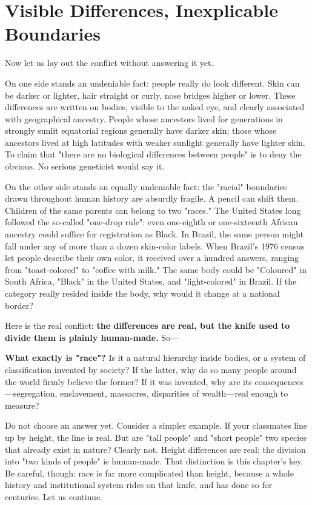 \section{Visible Differences, Inexplicable Boundaries}
Now let us lay out the conflict without answering it yet.

On one side stands an undeniable fact: people really do look different. Skin can be darker or lighter, hair straight or curly, nose bridges higher or lower. These differences are written on bodies, visible to the naked eye, and clearly associated with geographical ancestry. People whose ancestors lived for generations in strongly sunlit equatorial regions generally have darker skin; those whose ancestors lived at high latitudes with weaker sunlight generally have lighter skin. To claim that "there are no biological differences between people" is to deny the obvious. No serious geneticist would say it.

On the other side stands an equally undeniable fact: the "racial" boundaries drawn throughout human history are absurdly fragile. A pencil can shift them. Children of the same parents can belong to two "races." The United States long followed the so-called "one-drop rule": even one-eighth or one-sixteenth African ancestry could suffice for registration as Black. In Brazil, the same person might fall under any of more than a dozen skin-color labels. When Brazil's 1976 census let people describe their own color, it received over a hundred answers, ranging from "toast-colored" to "coffee with milk." The same body could be "Coloured" in South Africa, "Black" in the United States, and "light-colored" in Brazil. If the category really resided inside the body, why would it change at a national border?

Here is the real conflict: \textbf{the differences are real, but the knife used to divide them is plainly human-made.} So---

\textbf{What exactly is "race"?} Is it a natural hierarchy inside bodies, or a system of classification invented by society? If the latter, why do so many people around the world firmly believe the former? If it was invented, why are its consequences---segregation, enslavement, massacres, disparities of wealth---real enough to measure?

Do not choose an answer yet. Consider a simpler example. If your classmates line up by height, the line is real. But are "tall people" and "short people" two species that already exist in nature? Clearly not. Height differences are real; the division into "two kinds of people" is human-made. That distinction is this chapter's key. Be careful, though: race is far more complicated than height, because a whole history and institutional system rides on that knife, and has done so for centuries. Let us continue.

